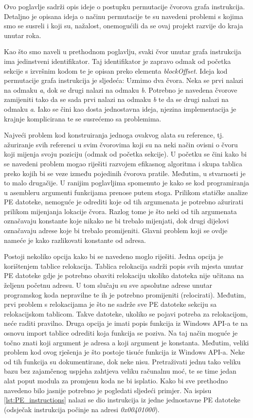 \documentclass[times, utf8, diplomski, numeric]{fer}
\begin{document}
Ovo poglavlje sadrži opis ideje o postupku permutacije čvorova grafa
instrukcija. Detaljno je opisana ideja o načinu permutacije te su navedeni
problemi s kojima smo se susreli i koji su, nažalost, onemogućili da se ovaj
projekt razvije do kraja unutar roka.

Kao što smo naveli u prethodnom poglavlju, svaki čvor unutar grafa instrukcija
ima jedinstveni identifikator. Taj identifikator je zapravo odmak od početka
sekcije s izvršnim kodom te je opisan preko elementa \emph{blockOffset}. Ideja
kod permutacije grafa instrukcija je sljedeća: Uzmimo dva čvora. Neka se prvi
nalazi na odmaku \emph{a}, dok se drugi nalazi na odmaku \emph{b}. Potrebno je
navedena čvorove zamijeniti tako da se sada prvi nalazi na odmaku \emph{b} te
da se drugi nalazi na odmaku \emph{a}. Iako se čini kao dosta jednostavna
ideja, njezina implementacija je krajnje komplicirana te se susrećemo sa
problemima.

Najveći problem kod konstruiranja jednoga ovakvog alata su reference, tj.
ažuriranje svih referenci u svim čvorovima koji su na neki način ovisni o čvoru
koji mijenja svoju poziciju (odmak od početka sekcije). U početku se čini kako
bi se navedeni problem mogao riješiti razvojem efikasnog algoritma i skupa
tablica preko kojih bi se veze između pojedinih čvorova pratile. Međutim, u
stvarnosti je to malo drugačije. U ranijim poglavljima spomenuto je kako se kod
programiranja u asembleru argumenti funkcijama prenose putem stoga. Prilikom
statičke analize PE datoteke, nemoguće je odrediti koje od tih argumenata je
potrebno ažurirati prilikom mijenjanja lokacije čvora. Razlog tome je što neki
od tih argumenata označavaju konstante koje nikako ne bi trebalo mijenjati, dok
drugi dijelovi označavaju adrese koje bi trebalo promijeniti. Glavni problem
koji se ovdje nameće je kako razlikovati konstante od adresa. 

Postoji nekoliko opcija kako bi se navedeno moglo riješiti. Jedna opcija je
korištenjem tablice relokacija. Tablica relokacija sadrži popis svih mjesta
unutar PE datoteke gdje je potrebno obaviti relokaciju ukoliko datoteka nije
učitana na željenu početnu adresu. U tom slučaju su sve apsolutne adrese unutar
programskog koda nepravilne te ih je potrebno promijeniti (relocirati).
Međutim, prvi problem s relokacijama je što ne sadrže sve PE datoteke sekciju
sa relokacijskom tablicom. Takve datoteke, ukoliko se pojavi potreba za
relokacijom, neće raditi pravilno. Druga opcija je imati popis funkcija iz
Windows API-a te na osnovu import tablice odrediti koja funkcija se poziva. Na
taj način moguće je točno znati koji argument je adresa a koji argument je
konstanta. Međutim, veliki problem kod ovog rješenja je što postoje tisuće
funkcija iz Windows API-a. Neke od tih funkcija su dokumentirane, dok neke
nisu. Pretraživati jednu tako veliku bazu bez zajamčenog uspjeha zahtjeva
veliku računalnu moć, te se time jedan alat poput modula za promjenu koda ne bi
isplatio. Kako bi sve prethodno navedeno bilo jasnije potrebno je pogledati
sljedeći primjer. Na ispisu \ref{lst:PE_instructions} nalazi se dio
instrukcija iz jedne jednostavne PE datoteke (odsječak instrukcija počinje na
adresi \emph{0x00401000}).
\end{document}

